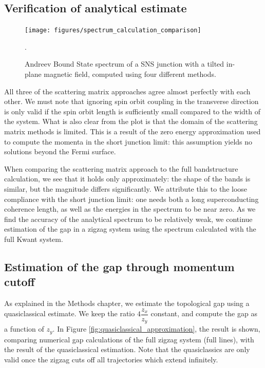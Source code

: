 		\subsection{Verification of analytical estimate}
			\begin{figure}[!htb]
			\centering
			\texttt{[image: figures/spectrum\_calculation\_comparison]}
			\caption{Andreev Bound State spectrum of a SNS junction with a tilted in-plane magnetic field, computed using four different methods.}.
			\label{fig:spectrum_calculation_comparison}
			\end{figure}
		
			All three of the scattering matrix approaches agree almost perfectly with each other.
			We must note that ignoring spin orbit coupling in the transverse direction is only valid if the spin orbit length is sufficiently small compared to the width of the system.
			What is also clear from the plot is that the domain of the scattering matrix methods is limited.
			This is a result of the zero energy approximation  used to compute the momenta in the short junction limit: this assumption yields no solutions beyond the Fermi surface.

			When comparing the scattering matrix approach to the full bandstructure calculation, we see that it holds only approximately: the shape of the bands is similar, but the magnitude differs significantly.
			We attribute this to the loose compliance with the short junction limit: one needs both a long superconducting coherence length, as well as the energies in the spectrum to be near zero.
			As we find the accuracy of the analytical spectrum to be relatively weak, we continue estimation of the gap in a zigzag system using the spectrum calculated with the full Kwant system.

		\subsection{Estimation of the gap through momentum cutoff}
			As explained in the Methods chapter, we estimate the topological gap using a quasiclassical estimate.
			We keep the ratio $4\dfrac{z_x}{z_y}$ constant, and compute the gap as a function of $z_y$.
			In Figure \ref{fig:quasiclassical_approximation}, the result is shown, comparing numerical gap calculations of the full zigzag system (full lines), with the result of the quasiclassical estimation.
			Note that the quasiclassics are only valid once the zigzag cuts off all trajectories which extend infinitely.

